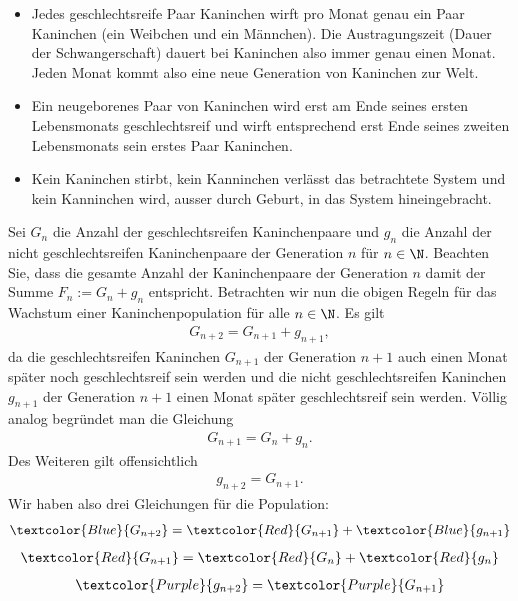 \begin{itemize}
    \item Jedes geschlechtsreife Paar Kaninchen wirft pro Monat genau ein Paar Kaninchen (ein Weibchen und ein Männchen). Die Austragungszeit (Dauer der Schwangerschaft) dauert bei Kaninchen also immer genau einen Monat. Jeden Monat kommt also eine neue Generation von Kaninchen zur Welt.
    \item Ein neugeborenes Paar von Kaninchen wird erst am Ende seines ersten Lebensmonats geschlechtsreif und wirft entsprechend erst Ende seines zweiten Lebensmonats sein erstes Paar Kaninchen.
    \item Kein Kaninchen stirbt, kein Kanninchen verlässt das betrachtete System und kein Kanninchen wird, ausser durch Geburt, in das System hineingebracht.
\end{itemize}
Sei $G_n$ die Anzahl der geschlechtsreifen Kaninchenpaare und $g_n$ die Anzahl der nicht geschlechtsreifen Kaninchenpaare der Generation $n$ für $n\in\N$. Beachten Sie, dass die gesamte Anzahl der Kaninchenpaare der Generation $n$ damit der Summe $F_n := G_n+g_n$ entspricht. Betrachten wir nun die obigen Regeln für das Wachstum einer Kaninchenpopulation für alle $n\in\N$. Es gilt
\begin{align}
    G_{n+2} = G_{n+1} + g_{n+1},
\end{align}
da die geschlechtsreifen Kaninchen $G_{n+1}$ der Generation $n+1$ auch einen Monat später noch geschlechtsreif sein werden und die nicht geschlechtsreifen Kaninchen $g_{n+1}$ der Generation $n+1$ einen Monat später geschlechtsreif sein werden. Völlig analog begründet man die Gleichung
\begin{align}
    G_{n+1} = G_{n} + g_{n}.
\end{align}
Des Weiteren gilt offensichtlich
\begin{align}
    g_{n+2}  = G_{n+1}.
\end{align}
Wir haben also drei Gleichungen für die Population:
\begin{align}\label{eq:Fib1}
    \textcolor{Blue}{G_{n+2}} = \textcolor{Red}{G_{n+1}} +  \textcolor{Blue}{g_{n+1}}
\end{align}
\begin{align}\label{eq:Fib2}
    \textcolor{Red}{G_{n+1}} = \textcolor{Red}{G_{n}} + \textcolor{Red}{g_{n}}
\end{align}
\begin{align}\label{eq:Fib3}
    \textcolor{Purple}{g_{n+2}}  = \textcolor{Purple}{G_{n+1}}
\end{align}

